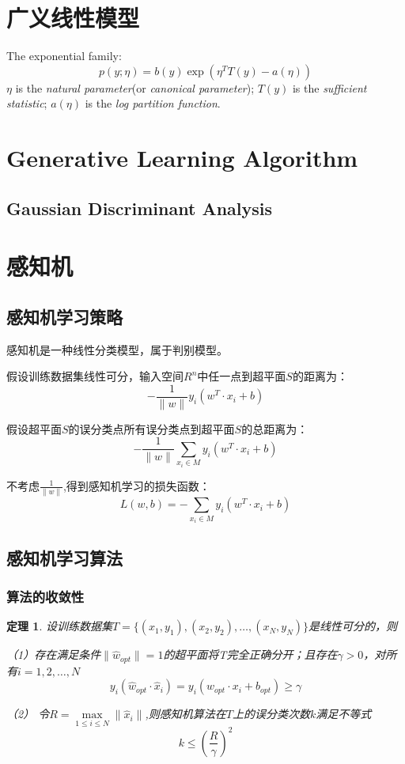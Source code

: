 \documentclass[UTF8]{ctexart}
\newtheorem{theorem}{定理}[section]
\begin{document}
	
	\section{广义线性模型}
	The exponential family:
	\begin{equation*}
		p(y;\eta)=b(y)\exp(\eta^TT(y)-a(\eta))
	\end{equation*}
	$\eta$ is the \emph{natural parameter}(or \emph{canonical parameter}); $T(y)$ is the \emph{sufficient statistic}; $a(\eta)$ is the \emph{log partition function}.
	
	
	\section{Generative Learning Algorithm}
	\subsection{Gaussian Discriminant Analysis}
	
	
	\section{感知机}
	\subsection{感知机学习策略}

	感知机是一种线性分类模型，属于判别模型。
	
	假设训练数据集线性可分，输入空间$R^n$中任一点到超平面$S$的距离为：
	\[
		-\frac{1}{\|w\|}y_i(w^T\cdot{x_i}+b)
	\]
	
	假设超平面$S$的误分类点所有误分类点到超平面$S$的总距离为：
	\[
		-\frac{1}{\|w\|}\sum_{x_i\in{M}}y_i(w^T\cdot{x_i}+b)
	\]
	
	不考虑$\frac{1}{\|w\|}$,得到感知机学习的损失函数：
	\[
		L(w,b)=-\sum_{x_i\in{M}}y_i(w^T\cdot{x_i}+b)
	\]
	
	\subsection{感知机学习算法}
	\subsubsection{算法的收敛性}
	\begin{theorem}
		设训练数据集$T=\{(x_1,y_1),(x_2,y_2),\dots,(x_N,y_N)\}$是线性可分的，则
		
		（1）存在满足条件$\|\hat{w}_{opt}\|=1$的超平面将T完全正确分开；且存在$\gamma>0$，对所有$i=1,2,\dots,N$
		\[
			y_i(\hat{w}_{opt}\cdot\hat{x}_i)=y_i(w_{opt}\cdot x_i+b_{opt})\geq\gamma
		\]
		
		（2） 令$R=\max\limits_{1\leq i \leq N}\|\hat{x}_i\|$,则感知机算法在$T$上的误分类次数$k$满足不等式
		\[
			k\leq(\frac{R}{\gamma})^2
		\]
	\end{theorem}
\end{document}
